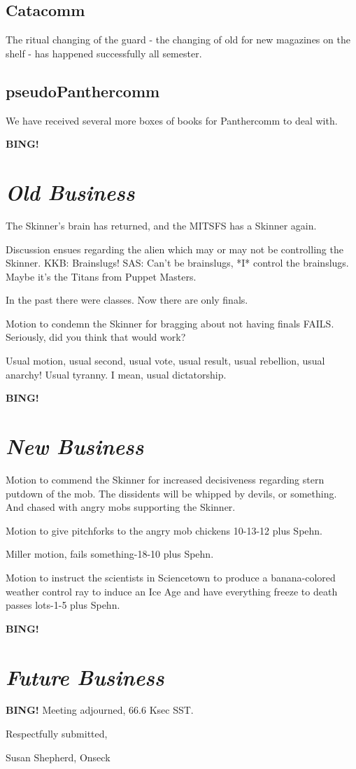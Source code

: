 \documentclass[10pt]{article}
\newcommand{\bing}{{\bf BING!} }
\newcommand{\goto}[1]{\bing \vskip 12pt \section*{{\em{#1}}}}
\newcommand{\ps}{ plus Spehn\xspace}
\newcommand{\onseck}{Susan Shepherd, Onseck}
\begin{document}
\subsection*{Catacomm}
The ritual changing of the guard - the changing of old for new magazines on the shelf - has happened successfully all semester.

\subsection*{pseudoPanthercomm}
We have received several more boxes of books for Panthercomm to deal with.

\goto{Old Business}
The Skinner's brain has returned, and the MITSFS has a Skinner again.

Discussion ensues regarding the alien which may or may not be controlling the Skinner.
KKB: Brainslugs!
SAS: Can't be brainslugs, *I* control the brainslugs. Maybe it's the Titans from Puppet Masters.

In the past there were classes. Now there are only finals.

Motion to condemn the Skinner for bragging about not having finals FAILS. Seriously, did you think that would work?

Usual motion, usual second, usual vote, usual result, usual rebellion, usual anarchy! Usual tyranny. I mean, usual dictatorship.

\goto{New Business}
Motion to commend the Skinner for increased decisiveness regarding stern putdown of the mob. The dissidents will be whipped by devils, or something. And chased with angry mobs supporting the Skinner.

Motion to give pitchforks to the angry mob chickens 10-13-12\ps.

Miller motion, fails something-18-10\ps.

Motion to instruct the scientists in Sciencetown to produce a banana-colored weather control ray to induce an Ice Age and have everything freeze to death passes lots-1-5\ps.

\goto{Future Business}

\bing
\noindent
Meeting adjourned, 66.6 Ksec SST.

\vspace{18pt}

\centerline{Respectfully submitted,}
\centerline{\onseck}
\end{document}
